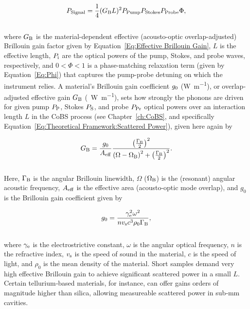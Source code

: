 \begin{equation}
  P_{\rm Signal} = \frac{1}{4}(G_{\rm B}L)^{2}P_{\rm Pump}P_{\rm Stokes}P_{\rm Probe}\Phi,
  \label{eq:Raman:ScatteredPowerPhi}
\end{equation}
\\
where \(G_{\rm B}\) is the material-dependent effective (acousto-optic overlap-adjusted) Brillouin gain factor given by Equation~\ref{Eq:Effective Brillouin Gain}, \(L\) is the effective length, \(P_{\rm i}\) are the optical powers of the pump, Stokes, and probe waves, respectively, and \(0 < \Phi < 1\) is a phase-matching relaxation term (given by Equation~\ref{Eq:Phi}) that captures the pump-probe detuning on which the instrument relies. A material’s Brillouin gain coefficient \(g_{\rm 0}\) (\si{\watt\per\meter}), or overlap‐adjusted effective gain \(G_{\rm B}\) (\si{\per\watt\per\meter}), sets how strongly the phonons are driven for given pump \(P_{\rm P}\), Stokes \(P_{\rm S}\), and probe \(P_{\rm Pr}\) optical powers over an interaction length \(L\) in the \ac{CoBS} process (see Chapter~\ref{ch:CoBS}, and specifically Equation~\ref{Eq:Theoretical Framework:Scattered Power}), given here again by

\begin{equation}
  G_{\rm B} = \frac{g_{0}}{A_{\rm eff}}\frac{\left(\frac{\Gamma_{\rm B}}{2}\right)^{2}}{\left(\Omega - \Omega_{\rm B}\right)^{2} + \left(\frac{\Gamma_{\rm B}}{2}\right)^{2}}.
  \label{eq:Raman:GB}
\end{equation}
\\
Here, \(\Gamma_{\rm B}\) is the angular Brillouin linewidth, \(\Omega\) (\(\Omega_{\rm B}\)) is the (resonant) angular acoustic frequency, \(A_{\rm eff}\) is the effective area (acousto-optic mode overlap), and \(g_{0}\) is the Brillouin gain coefficient given by

\begin{equation}
  g_{0} = \frac{\gamma_{\rm e}^{2}\omega^{2}}{nv_{\rm s}c^{3}\rho_{0}\Gamma_{\rm B}},
  \label{eq:Raman:g0}
\end{equation}
\\
where \(\gamma_{\rm e}\) is the electrostrictive constant, \(\omega\) is the angular optical frequency, \(n\) is the refractive index, \(v_{\rm s}\) is the speed of sound in the material, \(c\) is the speed of light, and \(\rho_{0}\) is the mean density of the material. Short samples demand very high effective Brillouin gain to achieve significant scattered power in a small \(L\). Certain tellurium‐based materials, for instance, can offer gains orders of magnitude higher than silica, \cite{sanghera2010nonlinear, abedin2005observation} allowing measureable scattered power in sub‐\si{\milli\meter} cavities.

